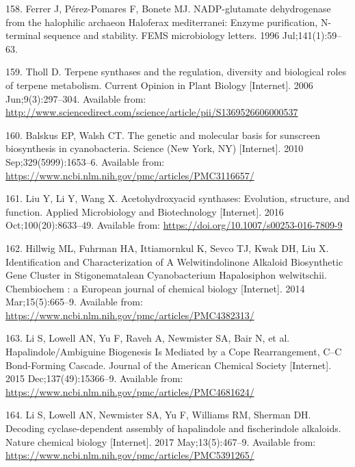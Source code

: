 \documentclass[12pt,twoside]{reedthesis}
\begin{document}
  \hypertarget{ref-ferrer_nadp-glutamate_1996}{}
  158. Ferrer J, Pérez-Pomares F, Bonete MJ. NADP-glutamate dehydrogenase
  from the halophilic archaeon Haloferax mediterranei: Enzyme
  purification, N-terminal sequence and stability. FEMS microbiology
  letters. 1996 Jul;141(1):59--63.
  
  \hypertarget{ref-tholl_terpene_2006}{}
  159. Tholl D. Terpene synthases and the regulation, diversity and
  biological roles of terpene metabolism. Current Opinion in Plant Biology
  {[}Internet{]}. 2006 Jun;9(3):297--304. Available from:
  \url{http://www.sciencedirect.com/science/article/pii/S1369526606000537}
  
  \hypertarget{ref-balskus_genetic_2010}{}
  160. Balskus EP, Walsh CT. The genetic and molecular basis for sunscreen
  biosynthesis in cyanobacteria. Science (New York, NY) {[}Internet{]}.
  2010 Sep;329(5999):1653--6. Available from:
  \url{https://www.ncbi.nlm.nih.gov/pmc/articles/PMC3116657/}
  
  \hypertarget{ref-liu_acetohydroxyacid_2016}{}
  161. Liu Y, Li Y, Wang X. Acetohydroxyacid synthases: Evolution,
  structure, and function. Applied Microbiology and Biotechnology
  {[}Internet{]}. 2016 Oct;100(20):8633--49. Available from:
  \url{https://doi.org/10.1007/s00253-016-7809-9}
  
  \hypertarget{ref-hillwig_identification_2014}{}
  162. Hillwig ML, Fuhrman HA, Ittiamornkul K, Sevco TJ, Kwak DH, Liu X.
  Identification and Characterization of A Welwitindolinone Alkaloid
  Biosynthetic Gene Cluster in Stigonematalean Cyanobacterium Hapalosiphon
  welwitschii. Chembiochem : a European journal of chemical biology
  {[}Internet{]}. 2014 Mar;15(5):665--9. Available from:
  \url{https://www.ncbi.nlm.nih.gov/pmc/articles/PMC4382313/}
  
  \hypertarget{ref-li_hapalindole_ambiguine_2015}{}
  163. Li S, Lowell AN, Yu F, Raveh A, Newmister SA, Bair N, et al.
  Hapalindole/Ambiguine Biogenesis Is Mediated by a Cope Rearrangement,
  C--C Bond-Forming Cascade. Journal of the American Chemical Society
  {[}Internet{]}. 2015 Dec;137(49):15366--9. Available from:
  \url{https://www.ncbi.nlm.nih.gov/pmc/articles/PMC4681624/}
  
  \hypertarget{ref-li_decoding_2017}{}
  164. Li S, Lowell AN, Newmister SA, Yu F, Williams RM, Sherman DH.
  Decoding cyclase-dependent assembly of hapalindole and fischerindole
  alkaloids. Nature chemical biology {[}Internet{]}. 2017
  May;13(5):467--9. Available from:
  \url{https://www.ncbi.nlm.nih.gov/pmc/articles/PMC5391265/}
  
\end{document}
